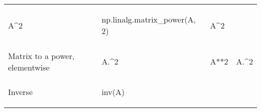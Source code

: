 \documentclass[10pt, landscape]{article}
\newenvironment{Shaded}{}{}
\newcommand{\DecValTok}[1]{\textcolor[rgb]{0.25,0.63,0.44}{{#1}}}
\newcommand{\FloatTok}[1]{\textcolor[rgb]{0.25,0.63,0.44}{{#1}}}
\newcommand{\OperatorTok}[1]{\textcolor[rgb]{0.40,0.40,0.40}{{#1}}}
\newcommand{\NormalTok}[1]{{#1}}
\begin{document}
\begin{multicols}{2}
\begin{tabular}[ ]{@{}llll@{}}
\begin{minipage}[t]{0.22\columnwidth}
\begin{Shaded}
\begin{Highlighting}[]
\NormalTok{A^}\FloatTok{2}
\end{Highlighting}
\end{Shaded}
\strut
\end{minipage} & \begin{minipage}[t]{0.23\columnwidth}\raggedright\strut
\begin{Shaded}
\begin{Highlighting}[]
\NormalTok{np.linalg.matrix_power(A, }\DecValTok{2}\NormalTok{)}
\end{Highlighting}
\end{Shaded}
\strut
\end{minipage} & \begin{minipage}[t]{0.20\columnwidth}\raggedright\strut
\begin{Shaded}
\begin{Highlighting}[]
\NormalTok{A^}\FloatTok{2}
\end{Highlighting}
\end{Shaded}
\strut
\end{minipage}\tabularnewline
\begin{minipage}[t]{0.23\columnwidth}\raggedright\strut
Matrix to a power, elementwise\strut
\end{minipage} & \begin{minipage}[t]{0.22\columnwidth}\raggedright\strut
\begin{Shaded}
\begin{Highlighting}[]
\NormalTok{A.^}\FloatTok{2}
\end{Highlighting}
\end{Shaded}
\strut
\end{minipage} & \begin{minipage}[t]{0.23\columnwidth}\raggedright\strut
\begin{Shaded}
\begin{Highlighting}[]
\NormalTok{A}\OperatorTok{**}\DecValTok{2}
\end{Highlighting}
\end{Shaded}
\strut
\end{minipage} & \begin{minipage}[t]{0.20\columnwidth}\raggedright\strut
\begin{Shaded}
\begin{Highlighting}[]
\NormalTok{A.^}\FloatTok{2}
\end{Highlighting}
\end{Shaded}
\strut
\end{minipage}\tabularnewline
\begin{minipage}[t]{0.23\columnwidth}\raggedright\strut
Inverse\strut
\end{minipage} & \begin{minipage}[t]{0.22\columnwidth}\raggedright\strut
\begin{Shaded}
\begin{Highlighting}[]
\NormalTok{inv(A)}
\end{Highlighting}
\end{Shaded}


\end{minipage}
\end{tabular}
\end{multicols}
\end{document}
